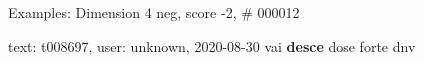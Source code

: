 \begin{frame}{Examples: Dimension 4 neg, score -2, \# 000012}
\footnotesize
\begin{alertblock}{text: t008697, user: unknown, 2020-08-30}
vai \textbf{desce} dose forte dnv \textbf{} 
\end{alertblock}
\end{frame}
